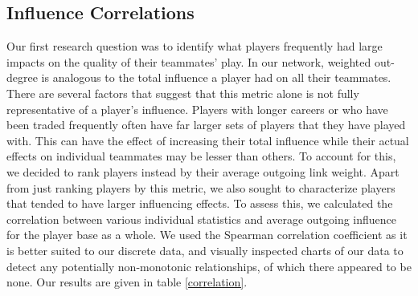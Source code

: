 \documentclass{article}
\begin{document}
\subsection{Influence Correlations}
Our first research question was to identify what players frequently had large impacts on the quality of their teammates' play.
In our network, weighted out-degree is analogous to the total influence a player had on all their teammates.
There are several factors that suggest that this metric alone is not fully representative of a player's influence.
Players with longer careers or who have been traded frequently often have far larger sets of players that they have played with.
This can have the effect of increasing their total influence while their actual effects on individual teammates may be lesser than others.
To account for this, we decided to rank players instead by their average outgoing link weight.
Apart from just ranking players by this metric, we also sought to characterize players that tended to have larger influencing effects.
To assess this, we calculated the correlation between various individual statistics and average outgoing influence for the player base as a whole.
We used the Spearman correlation coefficient as it is better suited to our discrete data, and visually inspected charts of our data to detect any potentially non-monotonic relationships, of which there appeared to be none.
Our results are given in table \ref{correlation}.
\end{document}
